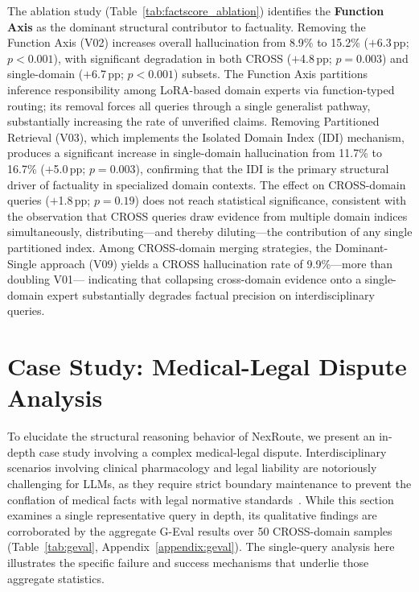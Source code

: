 \documentclass[a4paper,fleql]{cas-sc}
\begin{document}
The ablation study (Table~\ref{tab:factscore_ablation}) identifies the
\textbf{Function Axis} as the dominant structural contributor to factuality.
Removing the Function Axis (V02) increases overall hallucination from 8.9\%
to 15.2\% ($+$6.3\,pp; $p{<}0.001$), with significant degradation in both
CROSS ($+$4.8\,pp; $p{=}0.003$) and single-domain ($+$6.7\,pp; $p{<}0.001$)
subsets.
The Function Axis partitions inference responsibility among LoRA-based domain
experts via function-typed routing; its removal forces all queries through a
single generalist pathway, substantially increasing the rate of unverified
claims.
Removing Partitioned Retrieval (V03), which implements the Isolated Domain
Index (IDI) mechanism, produces a significant increase in single-domain
hallucination from 11.7\% to 16.7\% ($+$5.0\,pp; $p{=}0.003$), confirming
that the IDI is the primary structural driver of factuality in specialized
domain contexts.
The effect on CROSS-domain queries ($+$1.8\,pp; $p{=}0.19$) does not reach
statistical significance, consistent with the observation that CROSS queries
draw evidence from multiple domain indices simultaneously, distributing---and
thereby diluting---the contribution of any single partitioned index.
Among CROSS-domain merging strategies, the Dominant-Single approach (V09)
yields a CROSS hallucination rate of 9.9\%---more than doubling V01---
indicating that collapsing cross-domain evidence onto a single-domain expert
substantially degrades factual precision on interdisciplinary queries.

\section{Case Study: Medical-Legal Dispute Analysis}
\label{sec:casestudy}
To elucidate the structural reasoning behavior of NexRoute, we present an
in-depth case study involving a complex medical-legal dispute. Interdisciplinary
scenarios involving clinical pharmacology and legal liability are notoriously
challenging for LLMs, as they require strict boundary maintenance to prevent
the conflation of medical facts with legal normative
standards~\citep{singhal2023large, guha2023legalbench}. While this section
examines a single representative query in depth, its qualitative findings are
corroborated by the aggregate G-Eval results over 50 CROSS-domain samples
(Table~\ref{tab:geval}, Appendix~\ref{appendix:geval}).
The single-query analysis here illustrates the specific failure and success
mechanisms that underlie those aggregate statistics.
\end{document}
